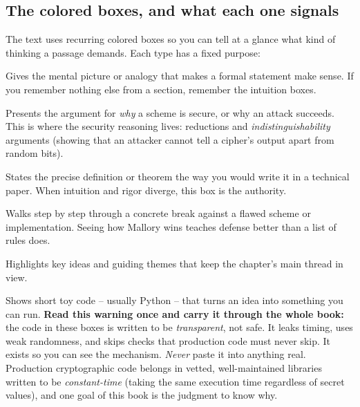 \subsection*{The colored boxes, and what each one signals}

The text uses recurring colored boxes so you can tell at a glance what kind of thinking a passage demands. Each type has a fixed purpose:

\begin{intuitionbox}
Gives the mental picture or analogy that makes a formal statement make sense. If you remember nothing else from a section, remember the intuition boxes.
\end{intuitionbox}

\begin{whybox}
Presents the argument for \emph{why} a scheme is secure, or why an attack succeeds. This is where the security reasoning lives: reductions and \emph{indistinguishability} arguments (showing that an attacker cannot tell a cipher's output apart from random bits).
\end{whybox}

\begin{formalbox}
States the precise definition or theorem the way you would write it in a technical paper. When intuition and rigor diverge, this box is the authority.
\end{formalbox}

\begin{attackbox}
Walks step by step through a concrete break against a flawed scheme or implementation. Seeing how Mallory wins teaches defense better than a list of rules does.
\end{attackbox}

\begin{focusbox}
Highlights key ideas and guiding themes that keep the chapter's main thread in view.
\end{focusbox}

\begin{implementbox}
Shows short toy code -- usually Python -- that turns an idea into something you can run. \textbf{Read this warning once and carry it through the whole book:} the code in these boxes is written to be \emph{transparent}, not safe. It leaks timing, uses weak randomness, and skips checks that production code must never skip. It exists so you can see the mechanism. \emph{Never} paste it into anything real. Production cryptographic code belongs in vetted, well-maintained libraries written to be \emph{constant-time} (taking the same execution time regardless of secret values), and one goal of this book is the judgment to know why.
\end{implementbox}

